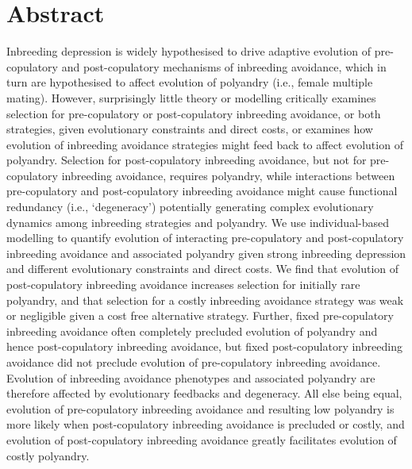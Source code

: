 \documentclass[10pt,letterpaper]{article}
\begin{document}
\section*{Abstract}
Inbreeding depression is widely hypothesised to drive adaptive evolution of pre-copulatory and post-copulatory mechanisms of inbreeding avoidance, which in turn are hypothesised to affect evolution of polyandry (i.e., female multiple mating). However, surprisingly little theory or modelling critically examines selection for pre-copulatory or post-copulatory inbreeding avoidance, or both strategies, given evolutionary constraints and direct costs, or examines how evolution of inbreeding avoidance strategies might feed back to affect evolution of polyandry. Selection for post-copulatory inbreeding avoidance, but not for pre-copulatory inbreeding avoidance, requires polyandry, while interactions between pre-copulatory and post-copulatory inbreeding avoidance might cause functional redundancy (i.e., `degeneracy') potentially generating complex evolutionary dynamics among inbreeding strategies and polyandry. We use individual-based modelling to quantify evolution of interacting pre-copulatory and post-copulatory inbreeding avoidance and associated polyandry given strong inbreeding depression and different evolutionary constraints and direct costs. We find that evolution of post-copulatory inbreeding avoidance increases selection for initially rare polyandry, and that selection for a costly inbreeding avoidance strategy was weak or negligible given a cost free alternative strategy. Further, fixed pre-copulatory inbreeding avoidance often completely precluded evolution of polyandry and hence post-copulatory inbreeding avoidance, but fixed post-copulatory inbreeding avoidance did not preclude evolution of pre-copulatory inbreeding avoidance. Evolution of inbreeding avoidance phenotypes and associated polyandry are therefore affected by evolutionary feedbacks and degeneracy. All else being equal, evolution of pre-copulatory inbreeding avoidance and resulting low polyandry is more likely when post-copulatory inbreeding avoidance is precluded or costly, and evolution of post-copulatory inbreeding avoidance greatly facilitates evolution of costly polyandry.
\end{document}

